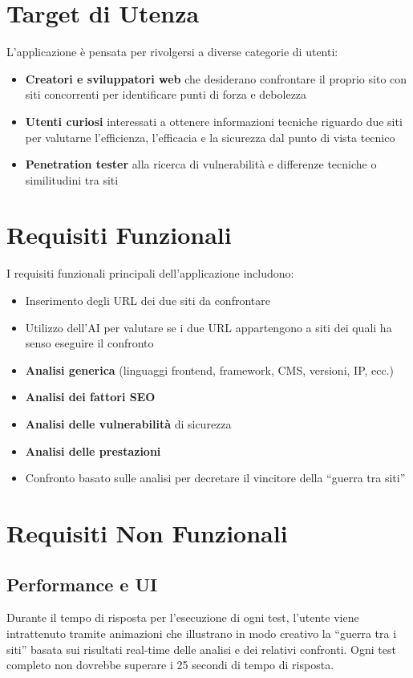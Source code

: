 \section{Target di Utenza}
L'applicazione è pensata per rivolgersi a diverse categorie di utenti:

\begin{itemize}
    \item \textbf{Creatori e sviluppatori web} che desiderano confrontare il proprio sito con siti concorrenti per identificare punti di forza e debolezza
    \item \textbf{Utenti curiosi} interessati a ottenere informazioni tecniche riguardo due siti per valutarne l'efficienza, l'efficacia e la sicurezza dal punto di vista tecnico
    \item \textbf{Penetration tester} alla ricerca di vulnerabilità e differenze tecniche o similitudini tra siti
\end{itemize}

\section{Requisiti Funzionali}
I requisiti funzionali principali dell'applicazione includono:

\begin{itemize}
    \item Inserimento degli URL dei due siti da confrontare
    \item Utilizzo dell'AI per valutare se i due URL appartengono a siti dei quali ha senso eseguire il confronto
    \item \textbf{Analisi generica} (linguaggi frontend, framework, CMS, versioni, IP, ecc.)
    \item \textbf{Analisi dei fattori SEO}
    \item \textbf{Analisi delle vulnerabilità} di sicurezza
    \item \textbf{Analisi delle prestazioni}
    \item Confronto basato sulle analisi per decretare il vincitore della ``guerra tra siti''
\end{itemize}

\section{Requisiti Non Funzionali}

\subsection{Performance e UI}
Durante il tempo di risposta per l'esecuzione di ogni test, l'utente viene intrattenuto tramite animazioni che illustrano in modo creativo la ``guerra tra i siti'' basata sui risultati real-time delle analisi e dei relativi confronti. Ogni test completo non dovrebbe superare i 25 secondi di tempo di risposta.

